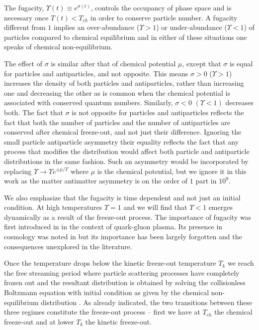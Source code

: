The fugacity, $\Upsilon(t)\equiv e^{\sigma(t)}$, controls the occupancy of phase space and is necessary once $T(t)<T_{ch}$ in order to conserve particle number.  A fugacity different from $1$ implies an over-abundance ($\Upsilon>1$) or under-abundance ($\Upsilon<1$) of particles compared to chemical equilibrium and in either of these  situations one speaks of chemical non-equilibrium. 

The effect of $\sigma$ is similar after that of chemical potential $\mu$, except that $\sigma$ is equal for particles and antiparticles, and not opposite. This means $\sigma>0$ ($\Upsilon>1$) increases the density of both particles and antiparticles, rather than increasing one and decreasing the other as is common when the chemical potential is associated with conserved quantum numbers.  Similarly, $\sigma<0$ $(\Upsilon<1)$ decreases both. The fact that $\sigma$ is not opposite for particles and antiparticles reflects the fact that both  the number of particles and the number of antiparticles are conserved after chemical freeze-out, and not just their difference.  Ignoring the small particle antiparticle asymmetry their equality reflects the fact that any process that modifies  the distribution would affect both particle and antiparticle distributions in the same fashion.   Such an asymmetry would be incorporated by replacing $\Upsilon\rightarrow \Upsilon e^{\pm\mu/T}$ where $\mu$ is the chemical potential, but we ignore it in this work as the matter antimatter asymmetry is on the order of $1$ part in $10^9$.

 We also emphasize that the fugacity is time dependent and not just an initial condition.  At high temperatures $\Upsilon=1$ and we will find that $\Upsilon<1$ emerges dynamically as a result of the freeze-out process. The importance of fugacity was first introduced in \cite{PhysRevLett.48.1066} in the context of quark-gluon plasma.  Its presence in cosmology was noted in  \cite{Bernstein:1985,Dolgov:1993} but its importance has been largely forgotten and the consequences unexplored in the literature.  



Once the temperature drops below the kinetic freeze-out temperature $T_k$ we reach  the free streaming period where  particle scattering processes have completely frozen out and the resultant distribution is obtained by solving the collisionless Boltzmann equation with initial condition as given by the chemical non-equilibrium   distribution .  As already indicated, the two transitions between these three regimes constitute  the freeze-out process -- first we have at $T_{ch}$ the chemical freeze-out and at lower $T_k$ the kinetic freeze-out.


